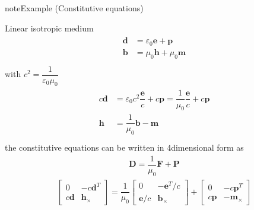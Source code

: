 \documentclass[letterpaper,10pt,english]{jupyterBook}
\begin{document}
\begin{sphinxadmonition}{note}{Example  (Constitutive equations)}



\sphinxAtStartPar
Linear isotropic medium
\begin{equation*}
\begin{split}\begin{aligned}
  \mathbf{d} & = \varepsilon_0 \mathbf{e} + \mathbf{p} \\
  \mathbf{b} & = \mu_0 \mathbf{h} + \mu_0 \mathbf{m} \\
\end{aligned}\end{split}
\end{equation*}
\sphinxAtStartPar
with \(c^2 = \dfrac{1}{\varepsilon_0 \mu_0}\)
\begin{equation*}
\begin{split}\begin{aligned}
  c \mathbf{d} & = \varepsilon_0 c^2 \dfrac{\mathbf{e}}{c} + c \mathbf{p} = \dfrac{1}{\mu_0} \dfrac{\mathbf{e}}{c} + c \mathbf{p} \\
  \mathbf{h} & = \dfrac{1}{ \mu_0} \mathbf{b} - \mathbf{m} \\
\end{aligned}\end{split}
\end{equation*}
\sphinxAtStartPar
the constitutive equations can be written in 4\sphinxhyphen{}dimensional form as
\begin{equation*}
\begin{split}\mathbf{D} = \dfrac{1}{\mu_0} \mathbf{F} + \mathbf{P}\end{split}
\end{equation*}\begin{equation*}
\begin{split}
                 \begin{bmatrix} 0 & - c \mathbf{d}^T  \\ c \mathbf{d} &  \mathbf{h}_{\times} \end{bmatrix} = 
\dfrac{1}{\mu_0} \begin{bmatrix} 0 & -\mathbf{e}^T / c \\ \mathbf{e}/c &  \mathbf{b}_{\times} \end{bmatrix} + 
                 \begin{bmatrix} 0 & - c \mathbf{p}^T  \\ c \mathbf{p} & -\mathbf{m}_{\times} \end{bmatrix}
\end{split}
\end{equation*}\end{sphinxadmonition}
\end{document}
